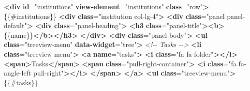 \documentclass[
  11pt,
]{krantz}
\newenvironment{Shaded}{\begin{snugshade}}{\end{snugshade}}
\newcommand{\CommentTok}[1]{\textcolor[rgb]{0.37,0.37,0.37}{\textit{#1}}}
\newcommand{\ErrorTok}[1]{\textcolor[rgb]{0.14,0.14,0.14}{\textbf{#1}}}
\newcommand{\KeywordTok}[1]{\textcolor[rgb]{0.27,0.27,0.27}{\textbf{#1}}}
\newcommand{\NormalTok}[1]{#1}
\newcommand{\OtherTok}[1]{\textcolor[rgb]{0.37,0.37,0.37}{#1}}
\newcommand{\StringTok}[1]{\textcolor[rgb]{0.5,0.5,0.5}{#1}}
\begin{document}
\begin{Shaded}
\begin{Highlighting}[]
    \KeywordTok{\textless{}div} \ErrorTok{id}\OtherTok{=}\StringTok{"institutions"} \ErrorTok{view{-}element}\OtherTok{=}\StringTok{"institutions"} \ErrorTok{class}\OtherTok{=}\StringTok{"row"}\KeywordTok{\textgreater{}}
\NormalTok{        \{\{\#institutions\}\}}
            \KeywordTok{\textless{}div} \ErrorTok{class}\OtherTok{=}\StringTok{"institution col{-}lg{-}4"}\KeywordTok{\textgreater{}}
                \KeywordTok{\textless{}div} \ErrorTok{class}\OtherTok{=}\StringTok{"panel panel{-}default"}\KeywordTok{\textgreater{}}
                    \KeywordTok{\textless{}div} \ErrorTok{class}\OtherTok{=}\StringTok{"panel{-}heading"}\KeywordTok{\textgreater{}}
                        \KeywordTok{\textless{}h3} \ErrorTok{class}\OtherTok{=}\StringTok{"panel{-}title"}\KeywordTok{\textgreater{}\textless{}b\textgreater{}}\NormalTok{\{\{name\}\}}\KeywordTok{\textless{}/b\textgreater{}\textless{}/h3\textgreater{}}
                    \KeywordTok{\textless{}/div\textgreater{}}
                    \KeywordTok{\textless{}div} \ErrorTok{class}\OtherTok{=}\StringTok{"panel{-}body"}\KeywordTok{\textgreater{}}
                        \KeywordTok{\textless{}ul} \ErrorTok{class}\OtherTok{=}\StringTok{"treeview{-}menu"} \ErrorTok{data{-}widget}\OtherTok{=}\StringTok{"tree"}\KeywordTok{\textgreater{}}
                            \CommentTok{\textless{}!{-}{-} Tasks {-}{-}\textgreater{}}
                            \KeywordTok{\textless{}li} \ErrorTok{class}\OtherTok{=}\StringTok{"treeview menu"}\KeywordTok{\textgreater{}}
                                \KeywordTok{\textless{}a} \ErrorTok{name}\OtherTok{=}\StringTok{"tasks"}\KeywordTok{\textgreater{}}
                                    \KeywordTok{\textless{}i} \ErrorTok{class}\OtherTok{=}\StringTok{"fa fa{-}folder"}\KeywordTok{\textgreater{}\textless{}/i\textgreater{}} \KeywordTok{\textless{}span\textgreater{}}\NormalTok{Tasks}\KeywordTok{\textless{}/span\textgreater{}}
                                    \KeywordTok{\textless{}span} \ErrorTok{class}\OtherTok{=}\StringTok{"pull{-}right{-}container"}\KeywordTok{\textgreater{}}
                                    \KeywordTok{\textless{}i} \ErrorTok{class}\OtherTok{=}\StringTok{"fa fa{-}angle{-}left pull{-}right"}\KeywordTok{\textgreater{}\textless{}/i\textgreater{}}
                                \KeywordTok{\textless{}/span\textgreater{}}
                                \KeywordTok{\textless{}/a\textgreater{}}
                                \KeywordTok{\textless{}ul} \ErrorTok{class}\OtherTok{=}\StringTok{"treeview{-}menu"}\KeywordTok{\textgreater{}}
\NormalTok{                                    \{\{\#tasks\}\}}

\end{Highlighting}
\end{Shaded}
\end{document}
